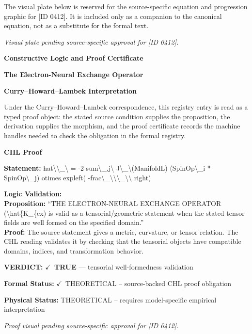 \begingroup\footnotesize\sloppy
The visual plate below is reserved for the source-specific equation and progression graphic for [ID 0412]. It is included only as a companion to the canonical equation, not as a substitute for the formal text.
\par\endgroup
\begingroup\footnotesize\itshape
Visual plate pending source-specific approval for [ID 0412].
\par\endgroup

\clearpage
\begingroup\tzpsupportsetup
\noindent\textbf{\fontsize{10.8pt}{12.8pt}\selectfont [ID 0412] Constructive Logic and Proof Certificate}\par
\noindent\textbf{\fontsize{10pt}{12pt}\selectfont The Electron-Neural Exchange Operator}\par
\vspace{0.45em}
\begingroup
\footnotesize
\setlength{\parskip}{0.22em}
\setlength{\parindent}{0pt}
\noindent\textbf{Curry--Howard--Lambek Interpretation}\par
Under the Curry--Howard--Lambek correspondence, this registry entry is read as a typed proof
object: the stated source condition supplies the proposition, the derivation supplies the
morphism, and the proof certificate records the machine handles needed to check the obligation
in the formal registry.

\vspace{0.45em}
\noindent\textbf{CHL Proof}\par
\textbf{Statement:} hat\textbackslash{}\textbackslash{}\_\textbackslash{} = -2 sum\textbackslash{}\_,j\textbackslash{} J\textbackslash{}\_\textbackslash{}(ManifoldL) (SpinOp\textbackslash{}\_i * SpinOp\textbackslash{}\_j) otimes expleft(
-frac\textbackslash{}\_\textbackslash{}\textbackslash{}\textbackslash{}\_\textbackslash{}\textbackslash{} right)

\textbf{Logic Validation:}\\
\textbf{Proposition:} ``THE ELECTRON-NEURAL EXCHANGE OPERATOR (\textbackslash{}hat\{K\_\{ex) is valid as a tensorial/geometric
statement when the stated tensor fields are well formed on the specified domain.''\\
\textbf{Proof:} The source statement gives a metric, curvature, or tensor relation. The CHL reading
validates it by checking that the tensorial objects have compatible domains, indices,
and transformation behavior.

\textbf{VERDICT:} \ensuremath{\checkmark}\ \textbf{TRUE} --- tensorial well-formedness validation

\textbf{Formal Status:} \ensuremath{\checkmark}\ THEORETICAL -- source-backed CHL proof obligation

\textbf{Physical Status:} THEORETICAL -- requires model-specific empirical interpretation
\par\vspace{0.45em}
\par
\vfill
\begingroup\footnotesize\itshape
Proof visual pending source-specific approval for [ID 0412].
\par\endgroup
\vfill
\endgroup
\endgroup
